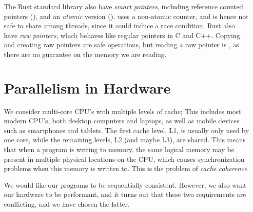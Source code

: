 \documentclass[a4paper,twoside]{report}
\begin{document}
The Rust standard library also have \emph{smart pointers}, including reference
counted pointers (), and an \emph{atomic} version
().  uses a non-atomic counter, and is hence not
safe to share among threads, since it could induce a race condition.
Rust also have \emph{raw pointers}, which behaves like regular pointers in C
and C++.  Copying and creating raw pointers are safe operations, but reading a
raw pointer is , as there are no guarantee on the memory we are
reading.








\section{Parallelism in Hardware}
   We consider multi-core CPU's with multiple levels of cache;
This includes most modern CPU's, both desktop computers and laptops, as well as
mobile devices such as smartphones and tablets.  The first cache level, L1, is
usually only used by one core, while the remaining levels, L2 (and maybe L3),
are shared.  This means that when a program is writing to memory, the same
logical memory may be present in multiple physical locations on the CPU, which
causes synchronization problems when this memory is written to. This is the
problem of \emph{cache coherence}.

We would like our programs to be sequentially consistent.  However, we also
want our hardware to be performant, and it turns out that these two
requirements are conflicting, and we have chosen the latter.
\end{document}
